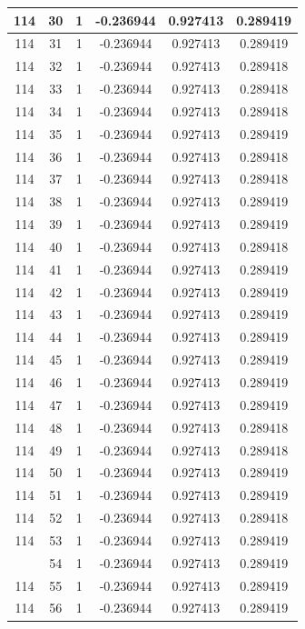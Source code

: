 \documentclass[12pt,a4paper]{article}
\numberwithin{equation}{section}
\numberwithin{figure}{section}
\numberwithin{table}{section}
\begin{document}
\begin{longtable}{|c|c|c|c|c|c|}
114 & 30 & 1 & -0.236944 & 0.927413 & 0.289419 \\ \hline
114 & 31 & 1 & -0.236944 & 0.927413 & 0.289419 \\ \hline
114 & 32 & 1 & -0.236944 & 0.927413 & 0.289418 \\ \hline
114 & 33 & 1 & -0.236944 & 0.927413 & 0.289418 \\ \hline
114 & 34 & 1 & -0.236944 & 0.927413 & 0.289418 \\ \hline
114 & 35 & 1 & -0.236944 & 0.927413 & 0.289419 \\ \hline
114 & 36 & 1 & -0.236944 & 0.927413 & 0.289418 \\ \hline
114 & 37 & 1 & -0.236944 & 0.927413 & 0.289418 \\ \hline
114 & 38 & 1 & -0.236944 & 0.927413 & 0.289419 \\ \hline
114 & 39 & 1 & -0.236944 & 0.927413 & 0.289419 \\ \hline
114 & 40 & 1 & -0.236944 & 0.927413 & 0.289418 \\ \hline
114 & 41 & 1 & -0.236944 & 0.927413 & 0.289419 \\ \hline
114 & 42 & 1 & -0.236944 & 0.927413 & 0.289419 \\ \hline
114 & 43 & 1 & -0.236944 & 0.927413 & 0.289419 \\ \hline
114 & 44 & 1 & -0.236944 & 0.927413 & 0.289419 \\ \hline
114 & 45 & 1 & -0.236944 & 0.927413 & 0.289419 \\ \hline
114 & 46 & 1 & -0.236944 & 0.927413 & 0.289419 \\ \hline
114 & 47 & 1 & -0.236944 & 0.927413 & 0.289419 \\ \hline
114 & 48 & 1 & -0.236944 & 0.927413 & 0.289418 \\ \hline
114 & 49 & 1 & -0.236944 & 0.927413 & 0.289418 \\ \hline
114 & 50 & 1 & -0.236944 & 0.927413 & 0.289419 \\ \hline
114 & 51 & 1 & -0.236944 & 0.927413 & 0.289419 \\ \hline
114 & 52 & 1 & -0.236944 & 0.927413 & 0.289418 \\ \hline
114 & 53 & 1 & -0.236944 & 0.927413 & 0.289419 \\ \hline
\pagebreak
114 & 54 & 1 & -0.236944 & 0.927413 & 0.289419 \\ \hline
114 & 55 & 1 & -0.236944 & 0.927413 & 0.289419 \\ \hline
114 & 56 & 1 & -0.236944 & 0.927413 & 0.289419 \\ \hline

\end{longtable}
\end{document}
